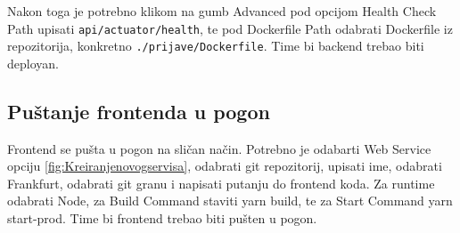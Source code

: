 			Nakon toga je potrebno klikom na gumb Advanced pod opcijom Health Check Path upisati \texttt{api/actuator/health}, te pod Dockerfile Path odabrati Dockerfile iz repozitorija, konkretno \texttt{./prijave/Dockerfile}.
			Time bi backend trebao biti deployan.

			\subsection{Puštanje frontenda u pogon} 
			Frontend se pušta u pogon na sličan način. Potrebno je odabarti Web Service opciju \ref{fig:Kreiranjenovogservisa}, odabrati git repozitorij, upisati ime, odabrati Frankfurt, odabrati git granu i napisati putanju do frontend koda. Za runtime odabrati Node, za Build Command staviti yarn build, te za Start Command yarn start-prod.
			Time bi frontend trebao biti pušten u pogon.

			\eject 